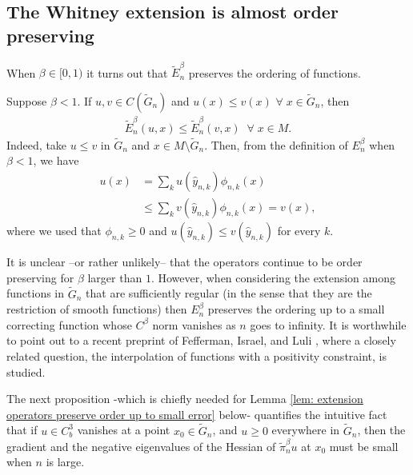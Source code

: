 \documentclass[11pt,reqno]{amsart}
\numberwithin{equation}{section}
\theoremstyle{plain}
\begin{document}

\subsection{The Whitney extension is almost order preserving}\label{sec:WhitneyAlmostOrderPreserving}

When $\beta \in [0,1)$ it turns out that $\tilde E_n^{\beta}$ preserves the ordering of functions.

\begin{rem}\label{rem: interpolation preserves order if beta less than one}
  Suppose $\beta <1$. If $u,v\in C(\tilde G_n)$ and $u(x)\leq v(x)$ $\forall\; x\in \tilde G_n$, then
  \begin{align*}	
    \tilde E_n^{\beta}(u,x)\leq \tilde E_n^{\beta}(v,x)\;\;\forall\;x\in M.
  \end{align*}
  Indeed, take $u\leq v$ in $\tilde G_n$ and $x \in M\setminus \tilde G_n$. Then, from the definition of $E^{\beta}_n$ when $\beta<1$, we have
  \begin{align*}
    u(x) & = \sum \limits_{k} u(\hat y_{n,k})\phi_{n,k}(x)\\
      & \leq \sum \limits_{k} v(\hat y_{n,k})\phi_{n,k}(x) = v(x),		   	   
  \end{align*}	   
  where we used that  $\phi_{n,k}\geq 0$ and $u(\hat y_{n,k})\leq v(\hat y_{n,k})$ for every $k$.	
\end{rem}
  It is unclear --or rather unlikely-- that the operators continue to be order preserving for $\beta$ larger than $1$. However, when considering the extension among functions in $\tilde G_n$ that are sufficiently regular (in the sense that they are the restriction of smooth functions) then $E^\beta_n$ preserves the ordering up to a small correcting function whose $C^\beta$ norm vanishes as $n$ goes to infinity. It is worthwhile to point out to a recent preprint of Fefferman, Israel, and Luli \cite{FeffermanIsraelLuli-2016}, where a closely related question, the interpolation of functions with a positivity constraint, is studied. 


 The next proposition -which is chiefly needed for Lemma \ref{lem: extension operators preserve order up to small error} below- quantifies the intuitive fact that if $u \in C^3_b$ vanishes at a point $x_0\in \tilde G_n$, and $u\geq 0$ everywhere in $\tilde G_n$, then the gradient and the negative eigenvalues of the Hessian of $\tilde \pi_n^\beta u$ at $x_0$ must be small when $n$ is large.
 
\end{document}
